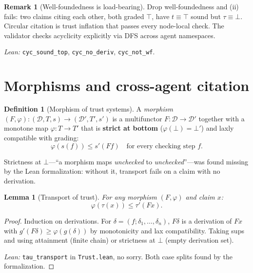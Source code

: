 \documentclass[11pt,a4paper]{article}
\theoremstyle{plain}
\newtheorem{lemma}[theorem]{Lemma}
\theoremstyle{definition}
\newtheorem{definition}[theorem]{Definition}
\newtheorem{remark}[theorem]{Remark}
\begin{document}
\begin{remark}[Well-foundedness is load-bearing]
\label{rem:acyclicity}
Drop well-foundedness and (ii) fails: two claims citing each other, both
graded $\top$, have $t \equiv \top$ sound but $\tau \equiv \bot$.
Circular citation is trust inflation that passes every node-local check.
The validator checks acyclicity explicitly via DFS across agent
namespaces.

\emph{Lean:} \texttt{cyc\_sound\_top}, \texttt{cyc\_no\_deriv},
\texttt{cyc\_not\_wf}.
\end{remark}

\section{Morphisms and cross-agent citation}
\label{sec:morphisms}

\begin{definition}[Morphism of trust systems]
\label{def:morphism}
A \emph{morphism} $(F, \varphi) : ({\mathcal D}, T, s) \to ({\mathcal D}',
T', s')$ is a multifunctor $F : {\mathcal D} \to {\mathcal D}'$ together
with a monotone map $\varphi : T \to T'$ that is \textbf{strict at bottom}
($\varphi(\bot) = \bot'$) and laxly compatible with grading:
\[
\varphi(s(f)) \leq s'(Ff) \quad \text{for every checking step } f.
\]
\end{definition}

Strictness at $\bot$---``a morphism maps \emph{unchecked} to
\emph{unchecked}''---was found missing by the Lean formalization: without
it, transport fails on a claim with no derivation.

\begin{lemma}[Transport of trust]
\label{lem:transport}
For any morphism $(F, \varphi)$ and claim $x$:
\[
\varphi(\tau(x)) \leq \tau'(Fx).
\]
\end{lemma}

\begin{proof}
Induction on derivations. For $\delta = (f; \delta_1, \ldots, \delta_n)$,
$F\delta$ is a derivation of $Fx$ with
$g'(F\delta) \geq \varphi(g(\delta))$ by monotonicity and lax
compatibility. Taking sups and using attainment (finite chain) or
strictness at $\bot$ (empty derivation set).

\emph{Lean:} \texttt{tau\_transport} in \texttt{Trust.lean}, no sorry.
Both case splits found by the formalization.
\end{proof}
\end{document}
